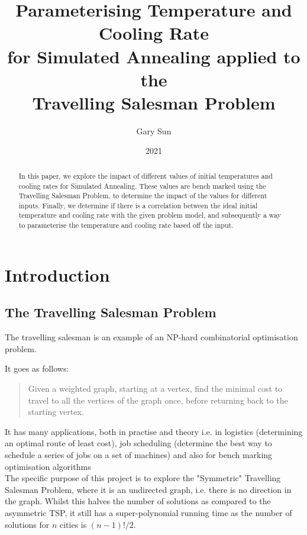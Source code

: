 \documentclass{article}
\title{
    Parameterising Temperature and Cooling Rate \\
    \large for Simulated Annealing applied to the \\
    Travelling Salesman Problem
}
\author{Gary Sun}
\date{2021}
\begin{document}
\maketitle

\begin{abstract}
    In this paper, we explore the impact of different values of initial temperatures and cooling rates for Simulated Annealing.
    These values are bench marked using the Travelling Salesman Problem, to determine the impact of the values for different inputs. 
    Finally, we determine if there is a correlation between the ideal initial temperature and cooling rate with the given problem model, and subsequently a way to parameterise the temperature and cooling rate based off the input.
\end{abstract}

\tableofcontents

\newpage
\section{Introduction}
\subsection{The Travelling Salesman Problem}
The travelling salesman is an example of an NP-hard combinatorial optimisation problem.

It goes as follows:
\begin{quote}
Given a weighted graph, starting at a vertex, find the minimal cost to travel to all the vertices of the graph once, before returning back to the starting vertex.
\end{quote}

It has many applications, both in practise and theory i.e. in logistics (determining an optimal route of least cost), job scheduling (determine the best way to schedule a series of jobs on a set of machines) and also for bench marking optimisation algorithms
\\

The specific purpose of this project is to explore the "Symmetric" Travelling Salesman Problem, where it is an undirected graph, i.e. there is no direction in the graph.
Whilst this halves the number of solutions as compared to the asymmetric TSP, it still has a super-polynomial running time as the number of solutions for $n$ cities is $(n - 1)! / 2$.
\end{document}
